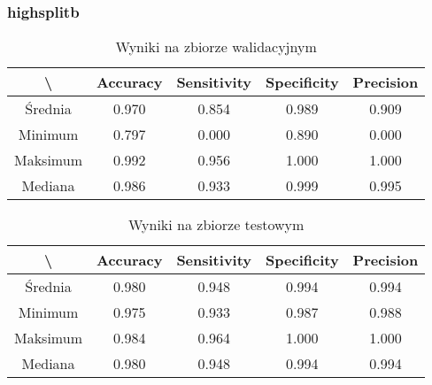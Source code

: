 \newpage
\subsubsection{highsplitb}

\begin{table}[!h]
	\centering
	\caption{Wyniki na zbiorze walidacyjnym}
	\vspace{6pt}
	{\footnotesize
		\begin{tabular}{|c|c|c|c|c|}
      \hline \textbackslash & Accuracy & Sensitivity & Specificity & Precision \\
      \hline Średnia & 0.970 & 0.854 & 0.989 & 0.909 \\
      \hline Minimum & 0.797 & 0.000 & 0.890 & 0.000 \\
      \hline Maksimum & 0.992 & 0.956 & 1.000 & 1.000 \\
      \hline Mediana & 0.986 & 0.933 & 0.999 & 0.995 \\
      \hline
		\end{tabular}
	}
	\vspace{0pt}
\end{table}

\begin{table}[!h]
	\centering
	\caption{Wyniki na zbiorze testowym}
	\vspace{6pt}
	{\footnotesize
		\begin{tabular}{|c|c|c|c|c|}
      \hline \textbackslash & Accuracy & Sensitivity & Specificity & Precision \\
      \hline Średnia & 0.980 & 0.948 & 0.994 & 0.994 \\
      \hline Minimum & 0.975 & 0.933 & 0.987 & 0.988 \\
      \hline Maksimum & 0.984 & 0.964 & 1.000 & 1.000 \\
      \hline Mediana & 0.980 & 0.948 & 0.994 & 0.994 \\
      \hline
		\end{tabular}
	}
	\vspace{0pt}
\end{table}
